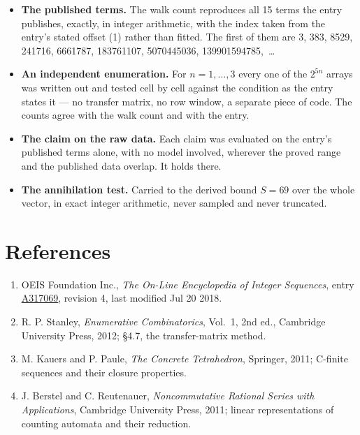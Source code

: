 \documentclass[11pt]{article}
\theoremstyle{definition}
\begin{document}
\begin{itemize}

\item {\bfseries The published terms.} The walk count reproduces all 15 terms the entry publishes, exactly, in integer arithmetic, with the index taken from the entry's stated offset (1) rather than fitted. The first of them are 3, 383, 8529, 241716, 6661787, 183761107, 5070445036, 139901594785,~\dots

\item {\bfseries An independent enumeration.} For $n = 1,\dots,3$ every one of the $2^{5n}$ arrays was written out and tested cell by cell against the condition as the entry states it --- no transfer matrix, no row window, a separate piece of code. The counts agree with the walk count and with the entry.

\item {\bfseries The claim on the raw data.} Each claim was evaluated on the entry's published terms alone, with no model involved, wherever the proved range and the published data overlap. It holds there.

\item {\bfseries The annihilation test.} Carried to the derived bound $S = 69$ over the whole vector, in exact integer arithmetic, never sampled and never truncated.

\end{itemize}

\section{References}

\begin{enumerate}

\item OEIS Foundation Inc., \emph{The On-Line Encyclopedia of Integer Sequences}, entry \href{https://oeis.org/A317069}{A317069}, revision 4, last modified Jul 20 2018.

\item R. P. Stanley, \emph{Enumerative Combinatorics}, Vol.~1, 2nd ed., Cambridge University Press, 2012; \S4.7, the transfer-matrix method.

\item M. Kauers and P. Paule, \emph{The Concrete Tetrahedron}, Springer, 2011; C-finite sequences and their closure properties.

\item J. Berstel and C. Reutenauer, \emph{Noncommutative Rational Series with Applications}, Cambridge University Press, 2011; linear representations of counting automata and their reduction.

\end{enumerate}
\end{document}
